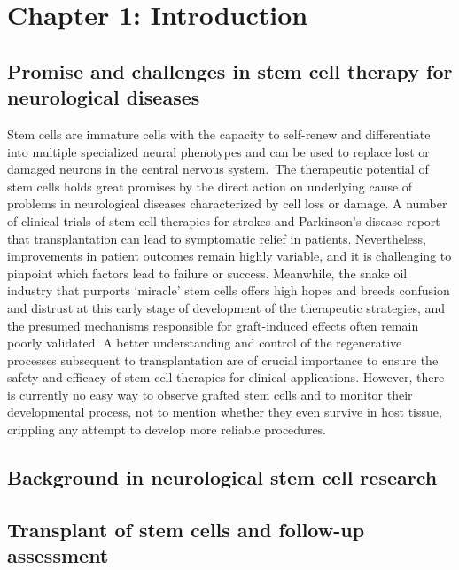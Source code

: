 \newpage
\section{Chapter 1: Introduction}

\subsection{Promise and challenges in stem cell  therapy for neurological diseases}

Stem cells  are immature cells with the capacity to self-renew and differentiate into  multiple specialized neural phenotypes and can be used to replace lost or  damaged neurons in the central nervous system. The therapeutic potential of stem cells  holds great promises by the direct action on underlying cause of problems in  neurological diseases characterized by cell loss or damage. A number of clinical trials of stem cell therapies for strokes  and Parkinson's disease report that transplantation can lead to symptomatic  relief in patients. Nevertheless, improvements in patient outcomes remain  highly variable, and it is challenging to pinpoint which factors lead to  failure or success. Meanwhile, the snake oil industry that purports ‘miracle’  stem cells offers high hopes and breeds confusion and distrust at this early  stage of development of the therapeutic strategies, and the presumed mechanisms  responsible for graft-induced effects often remain poorly validated. A better  understanding and control of the regenerative processes subsequent to  transplantation are of crucial importance to ensure the safety and efficacy of  stem cell therapies for clinical applications. However, there is currently no  easy way to observe grafted stem cells and to monitor their developmental  process, not to mention whether they even survive in host tissue, crippling any  attempt to develop more reliable procedures.

\subsection{Background in neurological stem cell  research}

\subsection{Transplant of stem cells and follow-up assessment}

